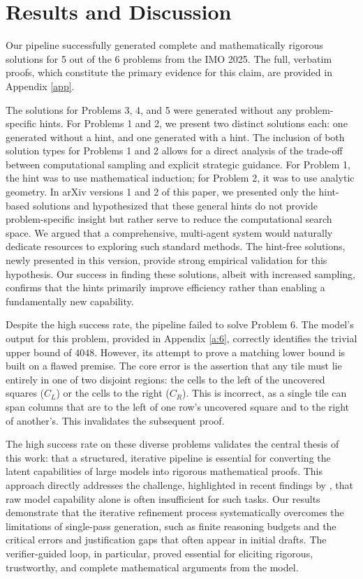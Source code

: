 \section{Results and Discussion}

Our pipeline successfully generated complete and mathematically rigorous solutions for 5 out of the 6 problems from the IMO 2025. The full, verbatim proofs, which constitute the primary evidence for this claim, are provided in Appendix \ref{app}.

The solutions for Problems 3, 4, and 5 were generated without any problem-specific hints. For Problems 1 and 2, we present two distinct solutions each: one generated without a hint, and one generated with a hint. The inclusion of both solution types for Problems 1 and 2 allows for a direct analysis of the trade-off between computational sampling and explicit strategic guidance. For Problem 1, the hint was to use mathematical induction; for Problem 2, it was to use analytic geometry. In arXiv versions 1 and 2 of this paper, we presented only the hint-based solutions and hypothesized that these general hints do not provide problem-specific insight but rather serve to reduce the computational search space. We argued that a comprehensive, multi-agent system would naturally dedicate resources to exploring such standard methods. The hint-free solutions, newly presented in this version, provide strong empirical validation for this hypothesis. Our success in finding these solutions, albeit with increased sampling, confirms that the hints primarily improve efficiency rather than enabling a fundamentally new capability.

Despite the high success rate, the pipeline failed to solve Problem 6. The model's output for this problem, provided in Appendix \ref{a:6}, correctly identifies the trivial upper bound of $4048$. However, its attempt to prove a matching lower bound is built on a flawed premise. The core error is the assertion that any tile must lie entirely in one of two disjoint regions: the cells to the left of the uncovered squares ($C_L$) or the cells to the right ($C_R$). This is incorrect, as a single tile can span columns that are to the left of one row's uncovered square and to the right of another's. This invalidates the subsequent proof.

The high success rate on these diverse problems validates the central thesis of this work: that a structured, iterative pipeline is essential for converting the latent capabilities of large models into rigorous mathematical proofs. This approach directly addresses the challenge, highlighted in recent findings by \cite{matharena2025}, that raw model capability alone is often insufficient for such tasks. Our results demonstrate that the iterative refinement process systematically overcomes the limitations of single-pass generation, such as finite reasoning budgets and the critical errors and justification gaps that often appear in initial drafts. The verifier-guided loop, in particular, proved essential for eliciting rigorous, trustworthy, and complete mathematical arguments from the model.

